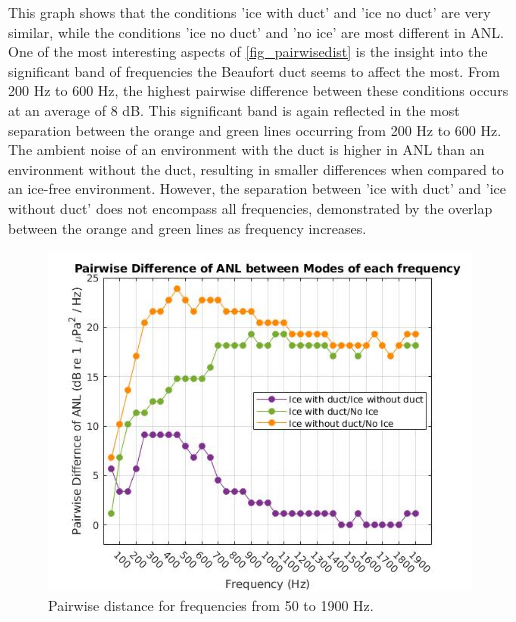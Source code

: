 This graph shows that the conditions 'ice with duct' and 'ice no duct' are very similar, while the conditions 'ice no duct' and 'no ice' are most different in ANL. One of the most interesting aspects of \autoref{fig_pairwisedist} is the insight into the significant band of frequencies the Beaufort duct seems to affect the most. From 200 Hz to 600 Hz, the highest pairwise difference between these conditions occurs at an average of 8 dB. This significant band is again reflected in the most separation between the orange and green lines occurring from 200 Hz to 600 Hz. The ambient noise of an environment with the duct is higher in ANL than an environment without the duct, resulting in smaller differences when compared to an ice-free environment. However, the separation between 'ice with duct' and 'ice without duct' does not encompass all frequencies, demonstrated by the overlap between the orange and green lines as frequency increases.

\begin{figure}[p]
\centering
\includegraphics[scale=0.6]{Figures/recolor_pairwise_dist_ANLs.jpg}
\caption{Pairwise distance for frequencies from 50 to 1900 Hz.}
\label{fig_pairwisedist}
\end{figure}

